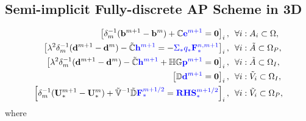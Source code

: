 \documentclass{article}
\begin{document}
\subsection{Semi-implicit Fully-discrete AP Scheme in 3D}


\begin{align}
    \left[\delta_m^{-1} (\mathbf{b}^{m+1} - \mathbf{b}^{m}) + \mathbb{C}\textcolor{blue}{\mathbf{e}^{m+1}} = \mathbf{0} \right]_i,\ \ &\forall i:A_i \subset \Omega, \label{equ:maxwell_faraday_ap}\\
    \left[\lambda^2\delta_m^{-1}(\mathbf{d}^{m+1} - \mathbf{d}^m)- \Tilde{\mathbb{C}}\textcolor{blue}{\mathbf{h}^{m+1}} = - \textcolor{blue}{\Sigma_\ast q_\ast \mathbf{F}^{n,m+1}_{\ast}}\right]_i,\ \ &\forall i:\Tilde{A}\subset\Omega_P, \\
    \left[\lambda^2\delta_m^{-1}(\mathbf{d}^{m+1} - \mathbf{d}^m)- \Tilde{\mathbb{C}}\textcolor{blue}{\mathbf{h}^{m+1}} + \mathbb{H}\mathbb{G}\textcolor{blue}{\mathbf{p}^{m+1}} = \mathbf{0} \right]_i,\ \ &\forall i:\Tilde{A}\subset\Omega_I, \label{equ:maxwell_ampere_ap}\\
    \left[\mathbb{D}\textcolor{blue}{\mathbf{d}^{m+1}} = \mathbf{0}\right]_i, \ \ &\forall i : \Tilde{V}_i \subset \Omega_I, \\
    \left[\delta_m^{-1}(\mathbf{U}_{*}^{m+1} - \mathbf{U}_{*}^{m}) + \mathbb{\Tilde{V}}^{-1}\mathbb{\Tilde{D}}\textcolor{blue}{\mathbf{F}_\ast^{m+1/2}} = \textcolor{blue}{\mathbf{RHS}_\ast^{m+1/2}} \right]_i,\ \ &\forall i : \Tilde{V}_i \subset \Omega_P, \label{equ:euler_ap}
\end{align}
where 
\end{document}
